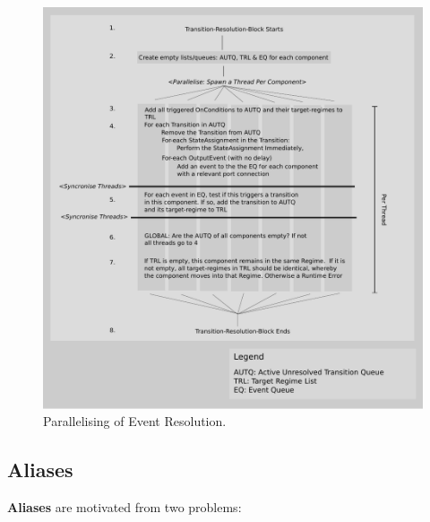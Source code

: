 \documentclass{article}
\begin{document}
\begin{figure}[htb!]
\center
\includegraphics[width=14cm]{images/ParallelisingTransitions.pdf}
\protect\caption{Parallelising of Event Resolution.}
\label{ParallelisingTransitions}
\end{figure}

\subsection{Aliases}
\label{alias}

\textbf{Aliases} are motivated from two problems:
\end{document}
